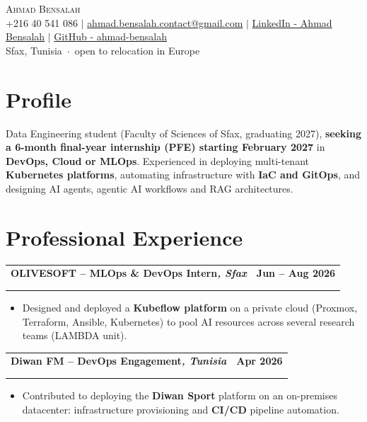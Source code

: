 \documentclass[a4paper,10pt]{article}
\makeatletter
\newcommand{\entry}[4]{%
\vspace{2pt}
\begin{tabular*}{\textwidth}{@{}l@{\extracolsep{\fill}}r@{}}
\textbf{#1} & \textbf{\small #2} \\
\ifstrempty{#3#4}{}{\textit{\small #3} & \textit{\small #4} \\}
\end{tabular*}\par\vspace{-1pt}
}
\makeatother
\begin{document}
\begin{center}
{\Huge\scshape\color{accent} Ahmad Bensalah}\\[3pt]
\small
+216 40 541 086 $|$
\href{mailto:ahmad.bensalah.contact@gmail.com}{ahmad.bensalah.contact@gmail.com} $|$
\href{https://www.linkedin.com/in/ahmad-bensalah}{LinkedIn - Ahmad Bensalah} $|$
\href{https://github.com/ahmad-bensalah}{GitHub - ahmad-bensalah}\\[1pt]
Sfax, Tunisia \,$\cdot$\, open to relocation in Europe
\end{center}

\vspace{-6pt}

\section{Profile}

{\small
Data Engineering student (Faculty of Sciences of Sfax, graduating 2027),
\textbf{seeking a 6-month final-year internship (PFE) starting February 2027}
in \textbf{DevOps, Cloud or MLOps}. Experienced in deploying multi-tenant
\textbf{Kubernetes platforms}, automating infrastructure with
\textbf{IaC and GitOps}, and designing AI agents, agentic AI workflows
and RAG architectures.
\par}

\section{Professional Experience}
\small

\entry
{OLIVESOFT -- MLOps \& DevOps Intern\textnormal{\textit{\small, Sfax}}}
{Jun -- Aug 2026}{}{}
\begin{itemize}
\item Designed and deployed a \textbf{Kubeflow platform} on a private cloud
(Proxmox, Terraform, Ansible, Kubernetes) to pool AI resources across
several research teams (LAMBDA unit).
\end{itemize}

\entry
{Diwan FM -- DevOps Engagement\textnormal{\textit{\small, Tunisia}}}
{Apr 2026}{}{}
\begin{itemize}
\item Contributed to deploying the \textbf{Diwan Sport} platform on an
on-premises datacenter: infrastructure provisioning and \textbf{CI/CD}
pipeline automation.
\end{itemize}
\end{document}
